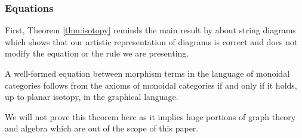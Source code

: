 \subsubsection{Equations}
\label{subsubsec:sdq}
First, Theorem \ref{thm:isotopy} reminds the main result by  about string diagrams which shows that our artistic representation of diagrams is correct and does not modify the equation or the rule we are presenting.
\begin{thm}
	\label{thm:isotopy}
	A well-formed equation between morphism terms in the language of monoidal categories follows from the axioms of monoidal categories if and only if it holds, up to planar isotopy, in the graphical language.
\end{thm}
We will not prove this theorem here as it implies huge portions of graph theory and algebra which are out of the scope of this paper.

\medskip


